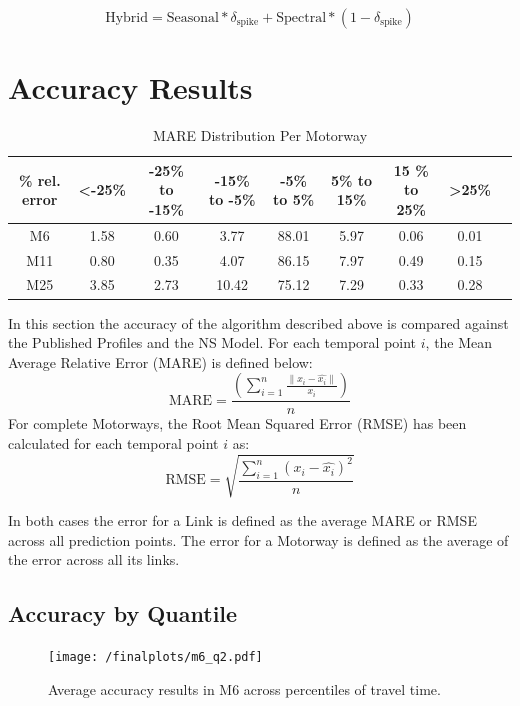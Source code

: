 \documentclass[conference, letterpaper]{IEEEtran}
\begin{document}
\begin{equation}
\textrm{Hybrid} = \textrm{Seasonal} * \delta_{\textrm{spike}} + \textrm{Spectral} * (1 - \delta_{\textrm{spike}})
\end{equation}

\section{Accuracy Results}
\begin{table}[bp]
	\caption{MARE Distribution Per Motorway}
	\centering
	\begin{center}
		\begin{tabular}{|C|C|C|C|C|C|C|C|C|}
			\hline
			\textbf{\% rel. error}&{\textless -25\%}&{-25\%\textbf{ to }-15\%}&{-15\%\textbf{ to }-5\%}&{-5\%\textbf{ to }5\%}&{5\%\textbf{ to }15\%}&{15 \%\textbf{ to }25\%}&{\textgreater 25\%}\\
			\hline
			M6& 1.58& 0.60& 3.77& 88.01& 5.97& 0.06& 0.01\\
			\hline
			M11& 0.80& 0.35& 4.07& 86.15& 7.97& 0.49& 0.15\\
			\hline
			M25& 3.85& 2.73& 10.42& 75.12& 7.29& 0.33& 0.28\\
			\hline
		\end{tabular}
		\label{mapeglobal}
	\end{center}
\end{table}
  
In this section the accuracy of the algorithm described above is compared against the Published Profiles and the NS Model. 
For each temporal point $i$, the Mean Average Relative Error (MARE) is defined below:
\begin{equation}
\textrm{MARE} =\frac{ \left( \sum_{i=1}^{n} \frac{\|x_i - \hat{x_i}\|}{x_i}\right)}{n}
\end{equation}
For complete Motorways, the Root Mean Squared Error (RMSE) has been calculated for each temporal point $i$ as:
\begin{equation}
\textrm{RMSE} = \sqrt{\frac{\sum_{i=1}^{n} (x_i - \hat{x_i})^2}{n}}
\end{equation}

In both cases the error for a Link is defined as the average MARE or RMSE across all prediction points.
The error for a Motorway is defined as the average of the error across all its links.
\subsection{Accuracy by Quantile}
\begin{figure}[htbp]
	\centerline{\texttt{[image: /finalplots/m6\_q2.pdf]}}
	\caption{Average accuracy results in M6 across percentiles of travel time.}
	\label{fig:m6q}
\end{figure}
\end{document}
